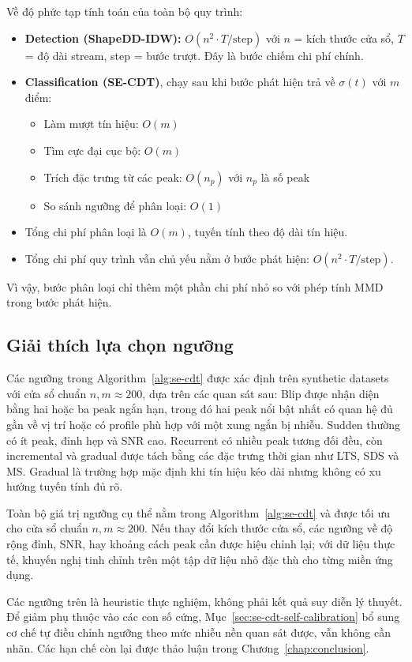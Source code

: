 Về độ phức tạp tính toán của toàn bộ quy trình:
\begin{itemize}
	\item \textbf{Detection (ShapeDD-IDW):} $O(n^2 \cdot T/\text{step})$ với $n$ = kích thước cửa sổ, $T$ = độ dài stream, step = bước trượt. Đây là bước chiếm chi phí chính.
	\item \textbf{Classification (SE-CDT)}, chạy sau khi bước phát hiện trả về $\sigma(t)$ với $m$ điểm:
	\begin{itemize}
		\item Làm mượt tín hiệu: $O(m)$
		\item Tìm cực đại cục bộ: $O(m)$
		\item Trích đặc trưng từ các peak: $O(n_p)$ với $n_p$ là số peak
		\item So sánh ngưỡng để phân loại: $O(1)$
	\end{itemize}
	\item Tổng chi phí phân loại là $O(m)$, tuyến tính theo độ dài tín hiệu.
	\item Tổng chi phí quy trình vẫn chủ yếu nằm ở bước phát hiện: $O(n^2 \cdot T/\text{step})$.
\end{itemize}

Vì vậy, bước phân loại chỉ thêm một phần chi phí nhỏ so với phép tính MMD trong bước phát hiện.

\subsection{Giải thích lựa chọn ngưỡng}
Các ngưỡng trong Algorithm~\ref{alg:se-cdt} được xác định trên synthetic datasets với cửa sổ chuẩn $n, m \approx 200$, dựa trên các quan sát sau:
Blip được nhận diện bằng hai hoặc ba peak ngắn hạn, trong đó hai peak nổi bật nhất có quan hệ đủ gần về vị trí hoặc có profile phù hợp với một xung ngắn bị nhiễu. Sudden thường có ít peak, đỉnh hẹp và SNR cao. Recurrent có nhiều peak tương đối đều, còn incremental và gradual được tách bằng các đặc trưng thời gian như LTS, SDS và MS. Gradual là trường hợp mặc định khi tín hiệu kéo dài nhưng không có xu hướng tuyến tính đủ rõ.

Toàn bộ giá trị ngưỡng cụ thể nằm trong Algorithm~\ref{alg:se-cdt} và được tối ưu cho cửa sổ chuẩn $n, m \approx 200$. Nếu thay đổi kích thước cửa sổ, các ngưỡng về độ rộng đỉnh, SNR, hay khoảng cách peak cần được hiệu chỉnh lại; với dữ liệu thực tế, khuyến nghị tinh chỉnh trên một tập dữ liệu nhỏ đặc thù cho từng miền ứng dụng.

Các ngưỡng trên là heuristic thực nghiệm, không phải kết quả suy diễn lý thuyết. Để giảm phụ thuộc vào các con số cứng, Mục~\ref{sec:se-cdt-self-calibration} bổ sung cơ chế tự điều chỉnh ngưỡng theo mức nhiễu nền quan sát được, vẫn không cần nhãn. Các hạn chế còn lại được thảo luận trong Chương~\ref{chap:conclusion}.

